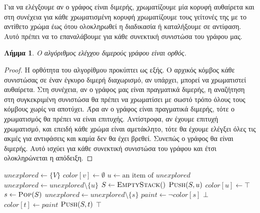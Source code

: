 \documentclass[11pt,a4paper,oneside]{report}
\newtheorem*{lemma}{Λήμμα}
\begin{document}
Για να ελέγξουμε αν ο γράφος είναι διμερής, χρωματίζουμε μία κορυφή αυθαίρετα και στη συνέχεια για κάθε χρωματισμένη κορυφή χρωματίζουμε τους γείτονές της με το αντίθετο χρώμα έως ότου ολοκληρωθεί η διαδικασία ή καταλήξουμε σε αντίφαση. 
Αυτό πρέπει να το επαναλάβουμε για κάθε συνεκτική συνιστώσα του γράφου μας.

\begin{lemma}
Ο αλγόριθμος ελέγχου διμερούς γράφου είναι ορθός.
\end{lemma}
\begin{proof}
Η ορθότητα του αλγορίθμου προκύπτει ως εξής. Ο αρχικός κόμβος κάθε συνιστώσας σε έναν έγκυρο διμερή διαχωρισμό, αν υπάρχει, μπορεί να χρωματιστεί αυθαίρετα. Στη συνέχεια, αν ο γράφος μας είναι πραγματικά διμερής, η αναζήτηση στη συγκεκριμένη συνιστώσα θα πρέπει να χρωματίσει με σωστό τρόπο όλους τους κόμβους χωρίς να αποτύχει. Άρα αν ο γράφος είναι πραγματικά διμερής, τότε ο χρωματισμός θα πρέπει να είναι επιτυχής. Αντίστροφα, αν έχουμε επιτυχή χρωματισμό, και επειδή κάθε χρώμα είναι αμετάκλητο, τότε θα έχουμε ελέγξει όλες τις ακμές για αντιφάσεις και καμία δεν θα έχει βρεθεί. Συνεπώς ο γράφος θα είναι διμερής. Αυτό ισχύει για κάθε συνεκτική συνιστώσα του γράφου και έτσι ολοκληρώνεται η απόδειξη.
\end{proof}

\begin{algorithm}[H]
\caption{\textgreek{Άσκηση 1}}
\begin{algorithmic}[1]

    \State $unexplored \gets \{ V \}$
        \State $color[ v ] \gets \emptyset$
    \EndFor
    	\State $u \gets \text{an item of } unexplored$
        \State $unexplored \gets unexplored \setminus \{u\}$
        \State $S \gets \Call{EmptyStack}$
        \State $\Call{Push}{S, u}$
        \State $color[ u ] \gets \top$
            \State $s \gets \Call{Pop}{S}$
            \State $unexplored \gets unexplored \setminus \{s\}$
            \State $paint \gets \lnot color[ s ]$
                        \State \Return $\bot$
                    \EndIf
                \Else
                    \State $color[ t ] \gets paint$
                    \State $\Call{Push}{S, t}$
                \EndIf
            \EndFor
        \EndWhile
    \EndWhile
    \State \Return $\top$
\EndProcedure
\end{algorithmic}
\end{algorithm}
\end{document}
